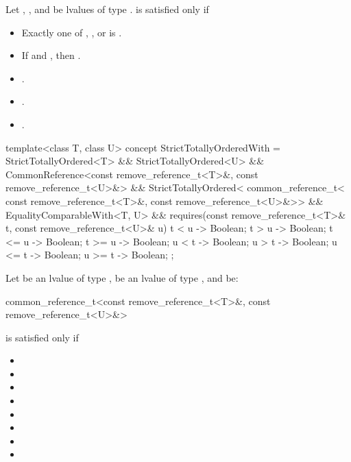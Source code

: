 \begin{itemdescr}
\pnum
Let , , and  be lvalues of type
.
 is satisfied only if

\begin{itemize}
\item Exactly one of , , or
       is .
\item If  and , then
      .
\item {}.
\item {}.
\item {}.
\end{itemize}

\end{itemdescr}

\begin{itemdecl}
template<class T, class U>
  concept StrictTotallyOrderedWith =
    StrictTotallyOrdered<T> && StrictTotallyOrdered<U> &&
    CommonReference<const remove_reference_t<T>&, const remove_reference_t<U>&> &&
    StrictTotallyOrdered<
      common_reference_t<
        const remove_reference_t<T>&,
        const remove_reference_t<U>&>> &&
    EqualityComparableWith<T, U> &&
    requires(const remove_reference_t<T>& t,
             const remove_reference_t<U>& u) {
      { t <  u } -> Boolean;
      { t >  u } -> Boolean;
      { t <= u } -> Boolean;
      { t >= u } -> Boolean;
      { u <  t } -> Boolean;
      { u >  t } -> Boolean;
      { u <= t } -> Boolean;
      { u >= t } -> Boolean;
    };
\end{itemdecl}

\begin{itemdescr}
\pnum
Let  be an lvalue of type ,
 be an lvalue of type ,
and  be:
\begin{codeblock}
common_reference_t<const remove_reference_t<T>&, const remove_reference_t<U>&>
\end{codeblock}
 is satisfied only if

\begin{itemize}
\item {}
\item {}
\item {}
\item {}
\item {}
\item {}
\item {}
\item {}
\end{itemize}
\end{itemdescr}

